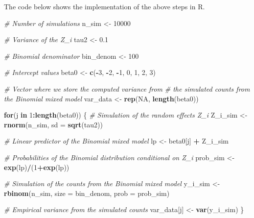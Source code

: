 \documentclass[
  letterpaper,
]{krantz}
\newenvironment{Shaded}{\begin{snugshade}}{\end{snugshade}}
\newcommand{\AttributeTok}[1]{\textcolor[rgb]{0.13,0.29,0.53}{#1}}
\newcommand{\CommentTok}[1]{\textcolor[rgb]{0.56,0.35,0.01}{\textit{#1}}}
\newcommand{\ConstantTok}[1]{\textcolor[rgb]{0.56,0.35,0.01}{#1}}
\newcommand{\ControlFlowTok}[1]{\textcolor[rgb]{0.13,0.29,0.53}{\textbf{#1}}}
\newcommand{\DecValTok}[1]{\textcolor[rgb]{0.00,0.00,0.81}{#1}}
\newcommand{\FloatTok}[1]{\textcolor[rgb]{0.00,0.00,0.81}{#1}}
\newcommand{\FunctionTok}[1]{\textcolor[rgb]{0.13,0.29,0.53}{\textbf{#1}}}
\newcommand{\NormalTok}[1]{#1}
\newcommand{\OtherTok}[1]{\textcolor[rgb]{0.56,0.35,0.01}{#1}}
\newcommand{\SpecialCharTok}[1]{\textcolor[rgb]{0.81,0.36,0.00}{\textbf{#1}}}
\begin{document}
The code below shows the implementation of the above steps in R.

\begin{Shaded}
\begin{Highlighting}[]
\CommentTok{\# Number of simulations}
\NormalTok{n\_sim }\OtherTok{\textless{}{-}} \DecValTok{10000}

\CommentTok{\# Variance of the Z\_i}
\NormalTok{tau2 }\OtherTok{\textless{}{-}} \FloatTok{0.1}

\CommentTok{\# Binomial denominator }
\NormalTok{bin\_denom }\OtherTok{\textless{}{-}} \DecValTok{100}

\CommentTok{\# Intercept values}
\NormalTok{beta0 }\OtherTok{\textless{}{-}} \FunctionTok{c}\NormalTok{(}\SpecialCharTok{{-}}\DecValTok{3}\NormalTok{, }\SpecialCharTok{{-}}\DecValTok{2}\NormalTok{, }\SpecialCharTok{{-}}\DecValTok{1}\NormalTok{, }\DecValTok{0}\NormalTok{, }\DecValTok{1}\NormalTok{, }\DecValTok{2}\NormalTok{, }\DecValTok{3}\NormalTok{)}

\CommentTok{\# Vector where we store the computed variance from}
\CommentTok{\# the simulated counts from the Binomial mixed model}
\NormalTok{var\_data }\OtherTok{\textless{}{-}} \FunctionTok{rep}\NormalTok{(}\ConstantTok{NA}\NormalTok{, }\FunctionTok{length}\NormalTok{(beta0))}


\ControlFlowTok{for}\NormalTok{(j }\ControlFlowTok{in} \DecValTok{1}\SpecialCharTok{:}\FunctionTok{length}\NormalTok{(beta0)) \{}
  \CommentTok{\# Simulation of the random effects Z\_i}
\NormalTok{  Z\_i\_sim }\OtherTok{\textless{}{-}} \FunctionTok{rnorm}\NormalTok{(n\_sim, }\AttributeTok{sd =} \FunctionTok{sqrt}\NormalTok{(tau2))}

  \CommentTok{\# Linear predictor of the Binomial mixed model}
\NormalTok{  lp }\OtherTok{\textless{}{-}}\NormalTok{ beta0[j]  }\SpecialCharTok{+}\NormalTok{ Z\_i\_sim}
  
  \CommentTok{\# Probabilities of the Binomial distribution conditional on Z\_i}
\NormalTok{  prob\_sim }\OtherTok{\textless{}{-}} \FunctionTok{exp}\NormalTok{(lp)}\SpecialCharTok{/}\NormalTok{(}\DecValTok{1}\SpecialCharTok{+}\FunctionTok{exp}\NormalTok{(lp))}
  
  \CommentTok{\# Simulation of the counts from the Binomial mixed model}
\NormalTok{  y\_i\_sim }\OtherTok{\textless{}{-}} \FunctionTok{rbinom}\NormalTok{(n\_sim, }\AttributeTok{size =}\NormalTok{ bin\_denom, }\AttributeTok{prob =}\NormalTok{ prob\_sim)}
  
  \CommentTok{\# Empirical variance from the simulated counts}
\NormalTok{  var\_data[j] }\OtherTok{\textless{}{-}} \FunctionTok{var}\NormalTok{(y\_i\_sim)}
\NormalTok{\}}


\end{Highlighting}
\end{Shaded}
\end{document}
